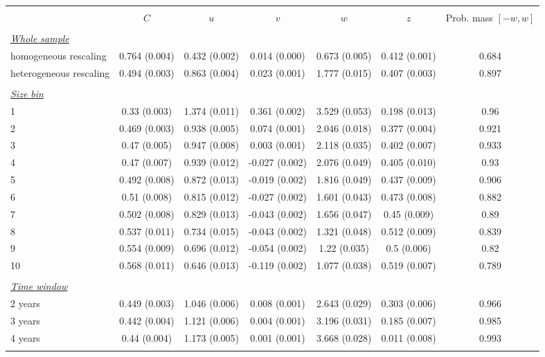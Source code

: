 
\begin{tabular}{@{\extracolsep{5pt}} l cccccc} 
\\[-1.8ex]\hline 
\hline \\[-1.8ex] 
 & $C$ & $u$ & $v$ & $w$ & $z$ & Prob. mass $[-w,w]$ \\ 
\hline \\[-1.8ex] 
\underline{{\it Whole sample}} &   &   &   &   &   &  \\ 
homogeneous rescaling & 0.764 (0.004) & 0.432 (0.002) & 0.014 (0.000) & 0.673 (0.005) & 0.412 (0.001) & 0.684 \\ 
heterogeneous rescaling & 0.494 (0.003) & 0.863 (0.004) & 0.023 (0.001) & 1.777 (0.015) & 0.407 (0.003) & 0.897 \\ 
 &   &   &   &   &   &  \\ 
\underline{{\it Size bin}} &   &   &   &   &   &  \\ 
1 & 0.33 (0.003) & 1.374 (0.011) & 0.361 (0.002) & 3.529 (0.053) & 0.198 (0.013) & 0.96 \\ 
2 & 0.469 (0.003) & 0.938 (0.005) & 0.074 (0.001) & 2.046 (0.018) & 0.377 (0.004) & 0.921 \\ 
3 & 0.47 (0.005) & 0.947 (0.008) & 0.003 (0.001) & 2.118 (0.035) & 0.402 (0.007) & 0.933 \\ 
4 & 0.47 (0.007) & 0.939 (0.012) & -0.027 (0.002) & 2.076 (0.049) & 0.405 (0.010) & 0.93 \\ 
5 & 0.492 (0.008) & 0.872 (0.013) & -0.019 (0.002) & 1.816 (0.049) & 0.437 (0.009) & 0.906 \\ 
6 & 0.51 (0.008) & 0.815 (0.012) & -0.027 (0.002) & 1.601 (0.043) & 0.473 (0.008) & 0.882 \\ 
7 & 0.502 (0.008) & 0.829 (0.013) & -0.043 (0.002) & 1.656 (0.047) & 0.45 (0.009) & 0.89 \\ 
8 & 0.537 (0.011) & 0.734 (0.015) & -0.043 (0.002) & 1.321 (0.048) & 0.512 (0.009) & 0.839 \\ 
9 & 0.554 (0.009) & 0.696 (0.012) & -0.054 (0.002) & 1.22 (0.035) & 0.5 (0.006) & 0.82 \\ 
10 & 0.568 (0.011) & 0.646 (0.013) & -0.119 (0.002) & 1.077 (0.038) & 0.519 (0.007) & 0.789 \\ 
 &   &   &   &   &   &  \\ 
\underline{{\it Time window}} &   &   &   &   &   &  \\ 
2 years & 0.449 (0.003) & 1.046 (0.006) & 0.008 (0.001) & 2.643 (0.029) & 0.303 (0.006) & 0.966 \\ 
3 years & 0.442 (0.004) & 1.121 (0.006) & 0.004 (0.001) & 3.196 (0.031) & 0.185 (0.007) & 0.985 \\ 
4 years & 0.44 (0.004) & 1.173 (0.005) & 0.001 (0.001) & 3.668 (0.028) & 0.011 (0.008) & 0.993 \\ 
\hline \\[-1.8ex] 
\end{tabular} 
